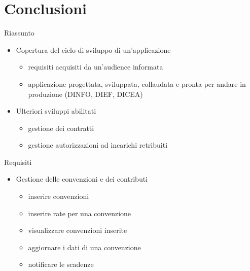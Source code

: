 \section{Conclusioni}
\begin{frame}{Riassunto}
\begin{itemize}
\item Copertura del ciclo di sviluppo di un'applicazione
	\vspace{0.6em}
	\begin{itemize}
	\item requisiti acquisiti da un'audience informata
	\vspace{0.4em}
	\item applicazione progettata, sviluppata, collaudata e\newline
	pronta per andare in produzione (DINFO, DIEF, DICEA)
	\end{itemize}
\vspace{1em}
\item Ulteriori sviluppi abilitati
\vspace{0.6em}
\begin{itemize}
\item gestione dei contratti
\vspace{0.4em}
\item gestione autorizzazioni ad incarichi retribuiti
\end{itemize}
\end{itemize}

\end{frame}
\begin{frame}{Requisiti}
\begin{itemize}
\item Gestione delle convenzioni e dei contributi
\vspace{0.8em}
	\begin{itemize}
	\item inserire convenzioni
	\item inserire rate per una convenzione
	\item visualizzare convenzioni inserite
	\item aggiornare i dati di una convenzione
	\item notificare le scadenze
	\end{itemize}
\end{itemize}
\end{frame}

